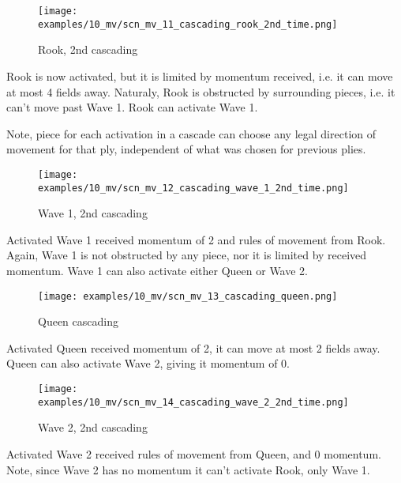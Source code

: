 \vspace*{0.075\textheight}
\noindent
\begin{wrapfigure}[15]{r}{0.5625\textwidth}
\centering
\texttt{[image: examples/10\_mv/scn\_mv\_11\_cascading\_rook\_2nd\_time.png]}
\caption{Rook, 2nd cascading}
\label{fig:scn_mv_11_cascading_rook_2nd_time}
\end{wrapfigure}
Rook is now activated, but it is limited by momentum received, i.e. it can
move at most 4 fields away. Naturaly, Rook is obstructed by surrounding pieces,
i.e. it can't move past Wave 1. Rook can activate Wave 1.

Note, piece for each activation in a cascade can choose any legal direction of
movement for that ply, independent of what was chosen for previous plies.

\clearpage %

\noindent
\begin{wrapfigure}[10]{l}{0.5625\textwidth}
\centering
\texttt{[image: examples/10\_mv/scn\_mv\_12\_cascading\_wave\_1\_2nd\_time.png]}
\caption{Wave 1, 2nd cascading}
\label{fig:scn_mv_12_cascading_wave_1_2nd_time}
\end{wrapfigure}
Activated Wave 1 received momentum of 2 and rules of movement from Rook. Again,
Wave 1 is not obstructed by any piece, nor it is limited by received momentum.
Wave 1 can also activate either Queen or Wave 2.

\vspace*{0.155\textheight}
\noindent
\begin{wrapfigure}[10]{r}{0.5625\textwidth}
\centering
\texttt{[image: examples/10\_mv/scn\_mv\_13\_cascading\_queen.png]}
\caption{Queen cascading}
\label{fig:scn_mv_13_cascading_queen}
\end{wrapfigure}
Activated Queen received momentum of 2, it can move at most 2 fields away.
Queen can also activate Wave 2, giving it momentum of 0.

\clearpage %

\noindent
\begin{wrapfigure}[7]{l}{0.5625\textwidth}
\centering
\texttt{[image: examples/10\_mv/scn\_mv\_14\_cascading\_wave\_2\_2nd\_time.png]}
\caption{Wave 2, 2nd cascading}
\label{fig:scn_mv_14_cascading_wave_2_2nd_time}
\end{wrapfigure}
Activated Wave 2 received rules of movement from Queen, and 0 momentum.
Note, since Wave 2 has no momentum it can't activate Rook, only Wave 1.

